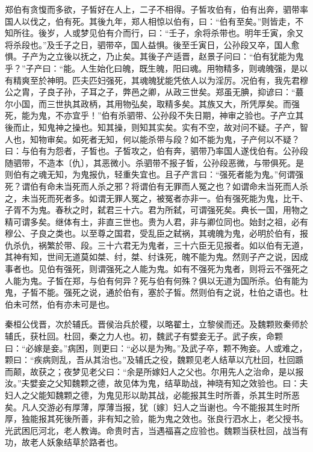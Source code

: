 \documentclass[]{article}
\begin{document}
郑伯有贪愎而多欲，子皙好在人上，二子不相得。子皙攻伯有，伯有出奔，驷带率国人以伐之，伯有死。其後九年，郑人相惊以伯有，曰：``伯有至矣。''则皆走，不知所往。後岁，人或梦见伯有介而行，曰：``壬子，余将杀带也。明年壬寅，余又将杀段也。''及壬子之日，驷带卒，国人益惧。後至壬寅日，公孙段又卒，国人愈惧。子产为之立後以抚之，乃止矣。其後子产适晋，赵景子问曰：``伯有犹能为鬼乎？''子产曰：``能。人生始化曰魄，既生魄，阳曰魂。用物精多，则魂魄强，是以有精爽至於神明。匹夫匹妇强死，其魂魄犹能凭依人以为淫厉。况伯有，我先君穆公之胄，子良子孙，子耳之子，弊邑之卿，从政三世矣。郑虽无腆，抑谚曰：``蕞尔小国，而三世执其政柄，其用物弘矣，取精多矣。其族又大，所凭厚矣。而强死，能为鬼，不亦宜乎！''伯有杀驷带、公孙段不失日期，神审之验也。子产立其後而止，知鬼神之操也。知其操，则知其实矣。实有不空，故对问不疑。子产，智人也，知物审矣。如死者无知，何以能杀带与段？如不能为鬼，子产何以不疑？曰：与伯有为怨者，子皙也。子皙攻之，伯有奔，驷带乃率国人遂伐伯有。公孙段随驷带，不造本〔仇〕，其恶微小。杀驷带不报子皙，公孙段恶微，与带俱死。是则伯有之魂无知，为鬼报仇，轻重失宜也。且子产言曰：``强死者能为鬼。''何谓强死？谓伯有命未当死而人杀之邪？将谓伯有无罪而人冤之也？如谓命未当死而人杀之，未当死而死者多。如谓无罪人冤之，被冤者亦非一。伯有强死能为鬼，比干、子胥不为鬼。春秋之时，弑君三十六。君为所弑，可谓强死矣。典长一国，用物之精可谓多矣。继体有土，非直三世也。贵为人君，非与卿位同也。始封之祖，必有穆公、子良之类也。以至尊之国君，受乱臣之弑祸，其魂魄为鬼，必明於伯有，报仇杀仇，祸繁於带、段。三十六君无为鬼者，三十六臣无见报者。如以伯有无道，其神有知，世间无道莫如桀、纣，桀、纣诛死，魄不能为鬼。然则子产之说，因成事者也。见伯有强死，则谓强死之人能为鬼。如有不强死为鬼者，则将云不强死之人能为鬼。子皙在郑，与伯有何异？死与伯有何殊？俱以无道为国所杀。伯有能为鬼，子皙不能。强死之说，通於伯有，塞於子皙。然则伯有之说，杜伯之语也。杜伯未可然，伯有亦未可是也。

秦桓公伐晋，次於辅氏。晋侯治兵於稷，以略翟土，立黎侯而还。及魏颗败秦师於辅氏，获杜回。杜回，秦之力人也。初，魏武子有嬖妾无子。武子疾，命颗曰：``必嫁是妾。''病困，则更曰：``必以是为殉。''及武子卒，颗不殉妾。人或难之，颗曰：``疾病则乱，吾从其治也。''及辅氏之役，魏颗见老人结草以亢杜回，杜回踬而颠，故获之；夜梦见老父曰：``余是所嫁妇人之父也。尔用先人之治命，是以报汝。''夫嬖妾之父知魏颗之德，故见体为鬼，结草助战，神晓有知之效验也。曰：夫妇人之父能知魏颗之德，为鬼见形以助其战，必能报其生时所善，杀其生时所恶矣。凡人交游必有厚薄，厚薄当报，犹〔嫁〕妇人之当谢也。今不能报其生时所厚，独能报其死後所善，非有知之验，能为鬼之效也。张良行泗水上，老父授书。光武困厄河北，老人教诲。命贵时吉，当遇福喜之应验也。魏颗当获杜回，战当有功，故老人妖象结草於路者也。
\end{document}
